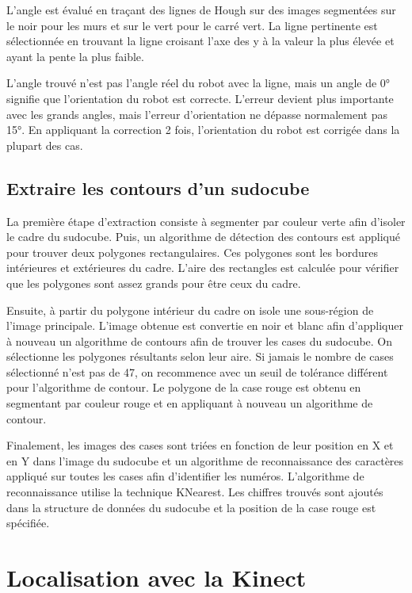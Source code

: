 L'angle est évalué en traçant des lignes de Hough sur des images segmentées sur le noir pour les murs et sur le vert pour le carré vert. La ligne pertinente est sélectionnée en trouvant la ligne croisant l'axe des y à la valeur la plus élevée et ayant la pente la plus faible. 

L'angle trouvé n'est pas l'angle réel du robot avec la ligne, mais un angle de 0° signifie que l'orientation du robot est correcte. L'erreur devient plus importante avec les grands angles, mais l'erreur d'orientation ne dépasse normalement pas 15°. En appliquant la correction 2 fois, l'orientation du robot est corrigée dans la plupart des cas.

\subsection{Extraire les contours d'un sudocube}

La première étape d'extraction consiste à segmenter par couleur verte afin d'isoler le cadre du sudocube. Puis, un algorithme de détection des contours est appliqué pour trouver deux polygones rectangulaires. Ces polygones sont les bordures intérieures et extérieures du cadre. L'aire des rectangles est calculée pour vérifier que les polygones sont assez grands pour être ceux du cadre.

Ensuite, à partir du polygone intérieur du cadre on isole une sous-région de l'image principale. L'image obtenue est convertie en noir et blanc afin d'appliquer à nouveau un algorithme de contours afin de trouver les cases du sudocube. On sélectionne les polygones résultants selon leur aire. Si jamais le nombre de cases sélectionné n'est pas de 47, on recommence avec un seuil de tolérance différent pour l'algorithme de contour. Le polygone de la case rouge est obtenu en segmentant par couleur rouge et en appliquant à nouveau un algorithme de contour. 

Finalement, les images des cases sont triées en fonction de leur position en X et en Y dans l'image du sudocube et un algorithme de reconnaissance des caractères appliqué sur toutes les cases afin d'identifier les numéros. L'algorithme de reconnaissance utilise la technique KNearest. Les chiffres trouvés sont ajoutés dans la structure de données du sudocube et la position de la case rouge est spécifiée.

\section{Localisation avec la Kinect}

